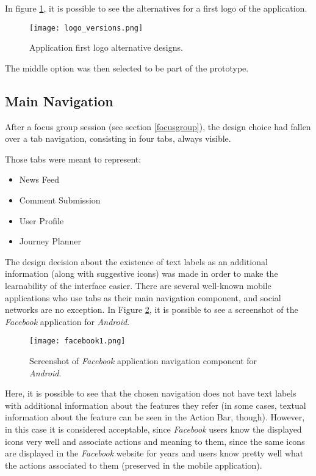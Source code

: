 In figure \ref{fig:logo}, it is possible to see the alternatives for a first logo of the application. 

\begin{figure}[htb]
  \begin{center}
    \leavevmode
    \texttt{[image: logo\_versions.png]}
    \caption{Application first logo alternative designs.}
    \label{fig:logo}
  \end{center}
\end{figure}

The middle option was then selected to be part of the prototype.


\subsection{Main Navigation}

After a focus group session (see section \ref{focusgroup}), the design choice had fallen over a tab navigation, consisting in four tabs, always visible.

Those tabs were meant to represent:

\begin{itemize}
\item News Feed
\item Comment Submission
\item User Profile
\item Journey Planner
\end{itemize}

The design decision about the existence of text labels as an additional information (along with suggestive icons) was made in order to make the learnability of the interface easier. There are several well-known mobile applications who use tabs as their main navigation component, and social networks are no exception. In Figure \ref{fig:facebook1}, it is possible to see a screenshot of the \emph{Facebook} application for \emph{Android}. 

\begin{figure}[htb]
  \begin{center}
    \leavevmode
    \texttt{[image: facebook1.png]}
    \caption{Screenshot of \emph{Facebook} application navigation component for \emph{Android}.}
    \label{fig:facebook1}
  \end{center}
\end{figure}

Here, it is possible to see that the chosen navigation does not have text labels with additional information about the features they refer (in some cases, textual information about the feature can be seen in the Action Bar, though). However, in this case it is considered acceptable, since \emph{Facebook} users know the displayed icons very well and associate actions and meaning to them, since the same icons are displayed in the \emph{Facebook} website for years and users know pretty well what the actions associated to them (preserved in the mobile application).


